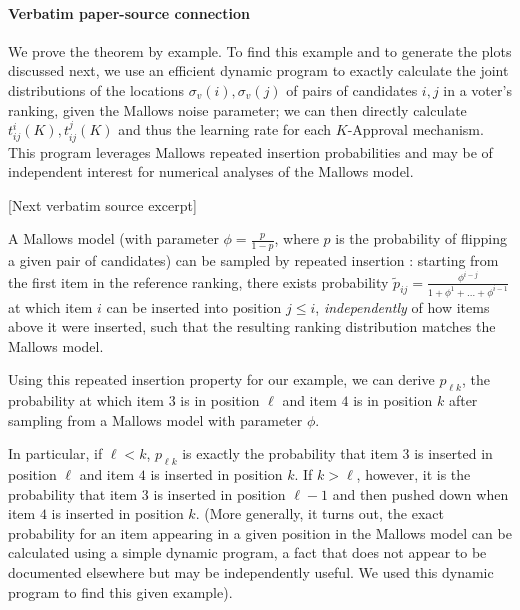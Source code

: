 \documentclass[10pt]{article}
\begin{document}
\paragraph{Verbatim paper-source connection}
\begin{ReviewVerbatim}
We prove the theorem by example. To find this example and to generate the plots discussed next, we use an efficient dynamic program to exactly calculate the joint distributions of the locations $\sigma_v(i),\sigma_v(j)$ of pairs of candidates $i,j$ in a voter's ranking, given the Mallows noise parameter; we can then directly calculate $t_{ij}^i(K), t_{ij}^j(K)$ and thus the learning rate for each $K$-Approval mechanism. This program leverages Mallows repeated insertion probabilities \cite{lu14a,diaconis_group_nodate} and may be of independent interest for numerical analyses of the Mallows model.

[Next verbatim source excerpt]

A Mallows model (with parameter $\phi = \frac{p}{1-p}$, where $p$ is the probability of flipping a given pair of candidates) can be sampled by repeated insertion \citep{lu14a,diaconis_group_nodate}: starting from the first item in the reference ranking, there exists probability $\tilde{p}_{ij} = \frac{\phi^{i-j}}{1 + \phi^1 + \dots + \phi^{i-1}}$ at which item $i$ can be inserted into position $j\leq i$, \textit{independently} of how items above it were inserted, such that the resulting ranking distribution matches the Mallows model.

Using this repeated insertion property for our example, we can derive $p_{\ell k}$, the probability at which item $3$ is in position $\ell$ and item $4$ is in position $k$ after sampling from a Mallows model with parameter $\phi$.

In particular, if $\ell < k$, $p_{\ell k}$ is exactly the probability that item $3$ is inserted in position $\ell$ and item $4$ is inserted in position $k$. If $k>\ell$, however, it is the probability that item $3$ is inserted in position $\ell - 1$ and then pushed down when item $4$ is inserted in position $k$. (More generally, it turns out, the exact probability for an item appearing in a given position in the Mallows model can be calculated using a simple dynamic program, a fact that does not appear to be documented  elsewhere but may be independently useful. We used this dynamic program to find this given example).
\end{ReviewVerbatim}
\end{document}
